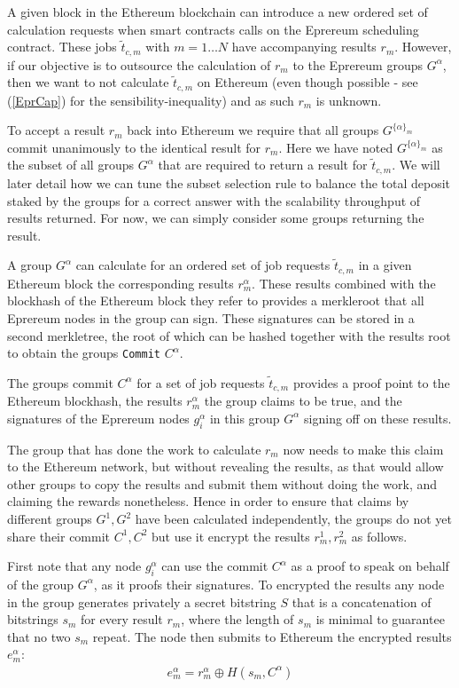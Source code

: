 \documentclass[twocolumn]{article}
\begin{document}
A given block in the Ethereum blockchain can introduce a new ordered set of calculation requests when smart contracts calls on the Eprereum scheduling contract.  These jobs $\tilde{t}_{c, m}$ with $m=1\dots N$ have accompanying results $r_m$.  However, if our objective is to outsource the calculation of $r_m$ to the Eprereum groups $G^\alpha$, then we want to not calculate $\tilde{t}_{c,m}$ on Ethereum (even though possible - see (\ref{EprCap}) for the sensibility-inequality) and as such $r_m$ is unknown.

To accept a result $r_m$ back into Ethereum we require that all groups $G^{\{\alpha\}_m}$ commit unanimously to the identical result for $r_m$.  Here we have noted $G^{\{\alpha\}_m}$ as the subset of all groups $G^\alpha$ that are required to return a result for $\tilde{t}_{c,m}$.  We will later detail how we can tune the subset selection rule to balance the total deposit staked by the groups for a correct answer with the scalability throughput of results returned.  For now, we can simply consider some groups returning the result.

A group $G^\alpha$ can calculate for an ordered set of job requests $\tilde{t}_{c,m}$ in a given Ethereum block the corresponding results $r_m^\alpha$.  These results combined with the blockhash of the Ethereum block they refer to provides a merkleroot that all Eprereum nodes in the group can sign.  These signatures can be stored in a second merkletree, the root of which can be hashed together with the results root to obtain the groups \texttt{Commit} $C^\alpha$.

The groups commit $C^\alpha$ for a set of job requests $\tilde{t}_{c,m}$ provides a proof point to the Ethereum blockhash, the results $r^\alpha_m$ the group claims to be true, and the signatures of the Eprereum nodes $g^\alpha_i$ in this group $G^\alpha$ signing off on these results.

The group that has done the work to calculate $r_m$ now needs to make this claim to the Ethereum network, but without revealing the results, as that would allow other groups to copy the results and submit them without doing the work, and claiming the rewards nonetheless.  Hence in order to ensure that claims by different groups $G^1, G^2$ have been calculated independently, the groups do not yet share their commit $C^1, C^2$ but use it encrypt the results $r^1_m, r^2_m$ as follows.

First note that any node $g^\alpha_i$ can use the commit $C^\alpha$ as a proof to speak on behalf of the group $G^\alpha$, as it proofs their signatures.  To encrypted the results any node in the group generates privately a secret bitstring $S$ that is a concatenation of bitstrings $s_m$ for every result $r_m$, where the length of $s_m$ is minimal to guarantee that no two $s_m$ repeat.  The node then submits to Ethereum the encrypted results $e_m^\alpha$:
\begin{align}
		e_m^\alpha = r_m^\alpha \oplus H(s_m, C^\alpha)
\end{align}
\end{document}
